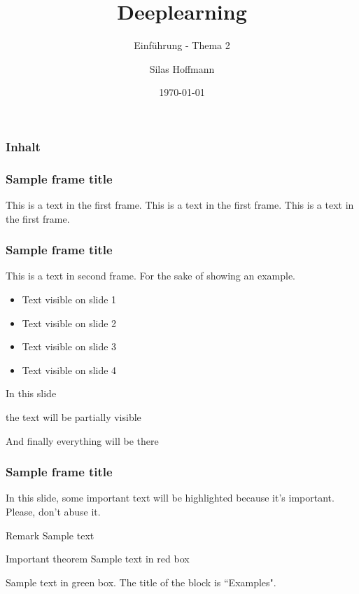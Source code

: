 \documentclass[10pt]{beamer}
\title{Deeplearning}
\subtitle{Einführung - Thema 2}
\date{\today}
\author{Silas Hoffmann}
\institute{Fachhochschule Wedel}
\begin{document}
\begin{frame} \centering \titlepage \end{frame}





\begin{frame}
\frametitle{Inhalt}
\tableofcontents
\end{frame}


\begin{frame}
\frametitle{Sample frame title}
This is a text in the first frame. This is a text in the first frame. This is a text in the first frame.
\end{frame}



\begin{frame}
\frametitle{Sample frame title}
This is a text in second frame. 
For the sake of showing an example.

\begin{itemize}
 \item<1-> Text visible on slide 1
 \item<2-> Text visible on slide 2
 \item<3> Text visible on slide 3
 \item<4-> Text visible on slide 4
\end{itemize}

\end{frame}

\begin{frame}
 In this slide \pause

 the text will be partially visible \pause

 And finally everything will be there
\end{frame}



\begin{frame}
\frametitle{Sample frame title}

In this slide, some important text will be
\alert{highlighted} because it's important.
Please, don't abuse it.

\begin{block}{Remark}
Sample text
\end{block}

\begin{alertblock}{Important theorem}
Sample text in red box
\end{alertblock}

\begin{examples}
Sample text in green box. The title of the block is ``Examples".
\end{examples}
\end{frame}
\end{document}

